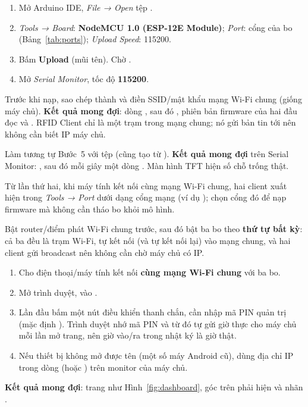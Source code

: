\begin{enumerate}
  \item Mở Arduino IDE, \emph{File → Open} tệp .
  \item \emph{Tools → Board}: \textbf{NodeMCU 1.0 (ESP-12E Module)}; \emph{Port}: cổng
        của bo (Bảng~\ref{tab:ports}); \emph{Upload Speed}: 115200.
  \item Bấm \textbf{Upload} (mũi tên). Chờ .
  \item Mở \emph{Serial Monitor}, tốc độ \textbf{115200}.
\end{enumerate}
Trước khi nạp, sao chép  thành  và
điền SSID/mật khẩu mạng Wi-Fi chung (giống máy chủ). \textbf{Kết quả mong đợi}: dòng
, sau đó , phiên bản
firmware của hai đầu đọc và . RFID Client chỉ là một trạm
trong mạng chung; nó gửi bản tin tới  nên không cần biết IP
máy chủ.

Làm tương tự Bước~5 với tệp  (cũng tạo
 từ ). \textbf{Kết quả mong đợi}
trên Serial Monitor: , sau đó mỗi giây một dòng
. Màn hình TFT hiện số chỗ trống thật.

\begin{lydo}
Từ lần thứ hai, khi máy tính kết nối cùng mạng Wi-Fi chung, hai client xuất hiện
trong \emph{Tools → Port} dưới dạng cổng mạng (ví dụ ); chọn
cổng đó để nạp firmware mà không cần tháo bo khỏi mô hình.
\end{lydo}

Bật router/điểm phát Wi-Fi chung trước, sau đó bật ba bo theo \textbf{thứ tự bất kỳ}:
cả ba đều là trạm Wi-Fi, tự kết nối (và tự kết nối lại) vào mạng chung, và hai client
gửi broadcast nên không cần chờ máy chủ có IP.

\begin{enumerate}
  \item Cho điện thoại/máy tính kết nối \textbf{cùng mạng Wi-Fi chung} với ba bo.
  \item Mở trình duyệt, vào .
  \item Lần đầu bấm một nút điều khiển thanh chắn, cần nhập mã PIN quản trị (mặc định
        ). Trình duyệt nhớ mã PIN và từ đó tự gửi giờ thực cho máy chủ mỗi
        lần mở trang, nên giờ vào/ra trong nhật ký là giờ thật.
  \item Nếu thiết bị không mở được tên  (một số máy Android cũ), dùng địa chỉ
        IP trong dòng  (hoặc ) trên monitor của máy chủ.
\end{enumerate}
\textbf{Kết quả mong đợi}: trang như Hình~\ref{fig:dashboard}, góc trên phải hiện
 và nhãn .

